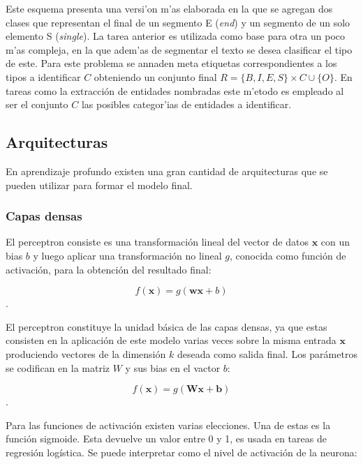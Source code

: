 Este esquema presenta una versi'on m'as elaborada en la que se agregan dos clases que representan el final 
de un segmento E (\emph{end}) y un segmento de un solo elemento S (\emph{single}). La tarea anterior es 
utilizada como base para otra un poco m'as compleja, en la que adem'as de segmentar el texto se desea clasificar 
el tipo de este. Para este problema se annaden meta etiquetas correspondientes a los tipos a identificar $C$ 
obteniendo un conjunto final $R = \{ B, I, E, S \} \times C \cup \{ O \}$. En tareas como la extracción de entidades
nombradas este m'etodo es empleado al ser el conjunto $C$ las posibles categor'ias de entidades a identificar.

\subsection{Arquitecturas}

En aprendizaje profundo existen una gran cantidad de arquitecturas que se pueden utilizar para formar el modelo 
final.

\subsubsection{Capas densas}

El perceptron consiste es una transformación lineal del vector de datos $\textbf{x}$ con un bias $b$ y 
luego aplicar una transformación no lineal $g$, conocida como función de activación, 
para la obtención del resultado final:

\begin{equation}
	f(\textbf{x}) = g(\textbf{w}\textbf{x} + b)
\end{equation}\label{eq:perceptron}.

El perceptron constituye la unidad básica de las capas densas, ya que estas consisten en la aplicación
de este modelo varias veces sobre la misma entrada $\textbf{x}$ produciendo vectores de la dimensión $k$ 
deseada como salida final. Los parámetros se codifican en la matriz $W$ y sus bias en el vactor $b$:

\begin{equation}
	f(\textbf{x}) = g(\textbf{Wx} + \textbf{b})
\end{equation}\label{eq:dense}.

Para las funciones de activación existen varias elecciones. Una de estas es la función sigmoide. 
Esta devuelve un valor entre 0 y 1, es usada en tareas de regresión logística. 
Se puede interpretar como el nivel de activación de la neurona:


